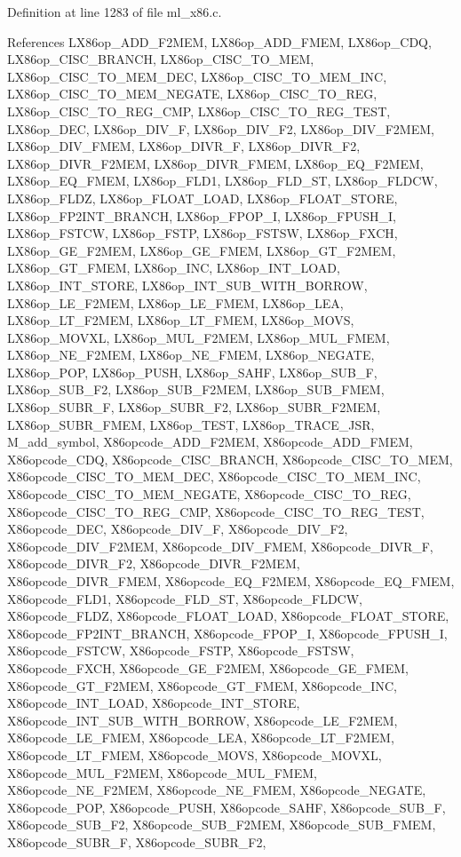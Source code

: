 Definition at line 1283 of file ml\_\-x86.c.

References LX86op\_\-ADD\_\-F2MEM, LX86op\_\-ADD\_\-FMEM, LX86op\_\-CDQ, LX86op\_\-CISC\_\-BRANCH, LX86op\_\-CISC\_\-TO\_\-MEM, LX86op\_\-CISC\_\-TO\_\-MEM\_\-DEC, LX86op\_\-CISC\_\-TO\_\-MEM\_\-INC, LX86op\_\-CISC\_\-TO\_\-MEM\_\-NEGATE, LX86op\_\-CISC\_\-TO\_\-REG, LX86op\_\-CISC\_\-TO\_\-REG\_\-CMP, LX86op\_\-CISC\_\-TO\_\-REG\_\-TEST, LX86op\_\-DEC, LX86op\_\-DIV\_\-F, LX86op\_\-DIV\_\-F2, LX86op\_\-DIV\_\-F2MEM, LX86op\_\-DIV\_\-FMEM, LX86op\_\-DIVR\_\-F, LX86op\_\-DIVR\_\-F2, LX86op\_\-DIVR\_\-F2MEM, LX86op\_\-DIVR\_\-FMEM, LX86op\_\-EQ\_\-F2MEM, LX86op\_\-EQ\_\-FMEM, LX86op\_\-FLD1, LX86op\_\-FLD\_\-ST, LX86op\_\-FLDCW, LX86op\_\-FLDZ, LX86op\_\-FLOAT\_\-LOAD, LX86op\_\-FLOAT\_\-STORE, LX86op\_\-FP2INT\_\-BRANCH, LX86op\_\-FPOP\_\-I, LX86op\_\-FPUSH\_\-I, LX86op\_\-FSTCW, LX86op\_\-FSTP, LX86op\_\-FSTSW, LX86op\_\-FXCH, LX86op\_\-GE\_\-F2MEM, LX86op\_\-GE\_\-FMEM, LX86op\_\-GT\_\-F2MEM, LX86op\_\-GT\_\-FMEM, LX86op\_\-INC, LX86op\_\-INT\_\-LOAD, LX86op\_\-INT\_\-STORE, LX86op\_\-INT\_\-SUB\_\-WITH\_\-BORROW, LX86op\_\-LE\_\-F2MEM, LX86op\_\-LE\_\-FMEM, LX86op\_\-LEA, LX86op\_\-LT\_\-F2MEM, LX86op\_\-LT\_\-FMEM, LX86op\_\-MOVS, LX86op\_\-MOVXL, LX86op\_\-MUL\_\-F2MEM, LX86op\_\-MUL\_\-FMEM, LX86op\_\-NE\_\-F2MEM, LX86op\_\-NE\_\-FMEM, LX86op\_\-NEGATE, LX86op\_\-POP, LX86op\_\-PUSH, LX86op\_\-SAHF, LX86op\_\-SUB\_\-F, LX86op\_\-SUB\_\-F2, LX86op\_\-SUB\_\-F2MEM, LX86op\_\-SUB\_\-FMEM, LX86op\_\-SUBR\_\-F, LX86op\_\-SUBR\_\-F2, LX86op\_\-SUBR\_\-F2MEM, LX86op\_\-SUBR\_\-FMEM, LX86op\_\-TEST, LX86op\_\-TRACE\_\-JSR, M\_\-add\_\-symbol, X86opcode\_\-ADD\_\-F2MEM, X86opcode\_\-ADD\_\-FMEM, X86opcode\_\-CDQ, X86opcode\_\-CISC\_\-BRANCH, X86opcode\_\-CISC\_\-TO\_\-MEM, X86opcode\_\-CISC\_\-TO\_\-MEM\_\-DEC, X86opcode\_\-CISC\_\-TO\_\-MEM\_\-INC, X86opcode\_\-CISC\_\-TO\_\-MEM\_\-NEGATE, X86opcode\_\-CISC\_\-TO\_\-REG, X86opcode\_\-CISC\_\-TO\_\-REG\_\-CMP, X86opcode\_\-CISC\_\-TO\_\-REG\_\-TEST, X86opcode\_\-DEC, X86opcode\_\-DIV\_\-F, X86opcode\_\-DIV\_\-F2, X86opcode\_\-DIV\_\-F2MEM, X86opcode\_\-DIV\_\-FMEM, X86opcode\_\-DIVR\_\-F, X86opcode\_\-DIVR\_\-F2, X86opcode\_\-DIVR\_\-F2MEM, X86opcode\_\-DIVR\_\-FMEM, X86opcode\_\-EQ\_\-F2MEM, X86opcode\_\-EQ\_\-FMEM, X86opcode\_\-FLD1, X86opcode\_\-FLD\_\-ST, X86opcode\_\-FLDCW, X86opcode\_\-FLDZ, X86opcode\_\-FLOAT\_\-LOAD, X86opcode\_\-FLOAT\_\-STORE, X86opcode\_\-FP2INT\_\-BRANCH, X86opcode\_\-FPOP\_\-I, X86opcode\_\-FPUSH\_\-I, X86opcode\_\-FSTCW, X86opcode\_\-FSTP, X86opcode\_\-FSTSW, X86opcode\_\-FXCH, X86opcode\_\-GE\_\-F2MEM, X86opcode\_\-GE\_\-FMEM, X86opcode\_\-GT\_\-F2MEM, X86opcode\_\-GT\_\-FMEM, X86opcode\_\-INC, X86opcode\_\-INT\_\-LOAD, X86opcode\_\-INT\_\-STORE, X86opcode\_\-INT\_\-SUB\_\-WITH\_\-BORROW, X86opcode\_\-LE\_\-F2MEM, X86opcode\_\-LE\_\-FMEM, X86opcode\_\-LEA, X86opcode\_\-LT\_\-F2MEM, X86opcode\_\-LT\_\-FMEM, X86opcode\_\-MOVS, X86opcode\_\-MOVXL, X86opcode\_\-MUL\_\-F2MEM, X86opcode\_\-MUL\_\-FMEM, X86opcode\_\-NE\_\-F2MEM, X86opcode\_\-NE\_\-FMEM, X86opcode\_\-NEGATE, X86opcode\_\-POP, X86opcode\_\-PUSH, X86opcode\_\-SAHF, X86opcode\_\-SUB\_\-F, X86opcode\_\-SUB\_\-F2, X86opcode\_\-SUB\_\-F2MEM, X86opcode\_\-SUB\_\-FMEM, X86opcode\_\-SUBR\_\-F, X86opcode\_\-SUBR\_\-F2, 